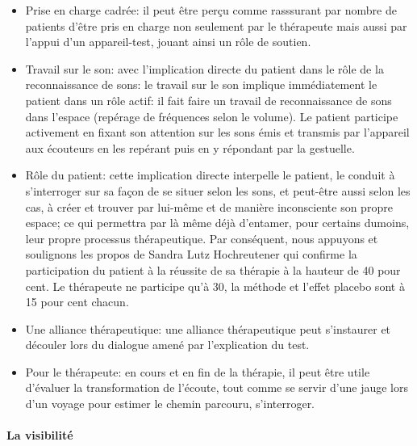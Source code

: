  \begin{itemize}

                           
\item Prise en charge cadrée: il peut être perçu comme  rasssurant  par
  nombre de patients d'être pris en charge non seulement par le
  thérapeute mais aussi par l'appui d'un appareil-test, jouant ainsi un rôle de soutien.
 
   
  \item Travail sur le son:  avec l'implication directe du
     patient dans le rôle de la 
     reconnaissance de sons: le travail sur le son implique immédiatement le patient
 dans un rôle actif: il fait faire un travail de reconnaissance de sons dans
 l'espace (repérage de fréquences selon le volume). Le patient
 participe activement en fixant son attention sur les
 sons émis et transmis par l'appareil aux écouteurs en les repérant
  puis en y
  répondant par la gestuelle.
  
  \item Rôle du patient: cette implication directe interpelle le patient, le conduit à
    s'interroger sur sa façon de 
    se situer selon les sons, et  peut-être aussi selon les cas, à
    créer et trouver par lui-même et de manière
 inconsciente  
 son propre espace; ce  qui permettra par là même déjà d'entamer, pour certains dumoins, leur propre
 processus thérapeutique.
 Par conséquent, nous appuyons et soulignons  les propos de Sandra Lutz
 Hochreutener qui confirme la participation du patient à la réussite de sa thérapie à la hauteur de 
 40 pour cent. Le thérapeute ne participe qu'à 30, la
 méthode et l'effet placebo sont à 15 pour cent chacun.
 
 \item Une alliance thérapeutique: une alliance thérapeutique  peut
   s'instaurer et  découler lors du
   dialogue amené par l'explication du test.
 
\item Pour le thérapeute: en cours et en fin de la thérapie, il peut
  être utile d'évaluer la transformation de l'écoute, tout
comme se servir d'une jauge  lors d'un voyage pour estimer le chemin
parcouru, s'interroger.

  
\end{itemize}

\paragraph{La visibilité}

